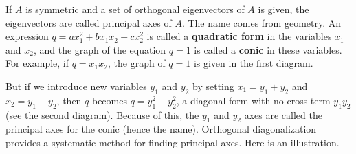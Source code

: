 If $A$ is symmetric and a set of orthogonal eigenvectors of $A$ is given, the eigenvectors are called principal axes of $A$. The name comes from geometry. An expression $q = ax_{1}^2 + bx_{1}x_{2} + cx_{2}^2$ is called a \textbf{quadratic form} in the variables $x_{1}$ and $x_{2}$, and the graph of the equation $q = 1$ is called a \textbf{conic} in these variables. For example, if $q = x_{1}x_{2}$, the graph of $q = 1$ is given in the first diagram.

But if we introduce new variables $y_{1}$ and $y_{2}$ by setting $x_{1} = y_{1} + y_{2}$ and $x_{2} = y_{1} - y_{2}$, then $q$ becomes $q = y_{1}^2 - y_{2}^2$, a diagonal form with no cross term $y_{1}y_{2}$ (see the second diagram). Because of this, the $y_{1}$ and $y_{2}$ axes are called the principal axes for the conic (hence the name). Orthogonal diagonalization provides a systematic method for finding principal axes. Here is an illustration.

